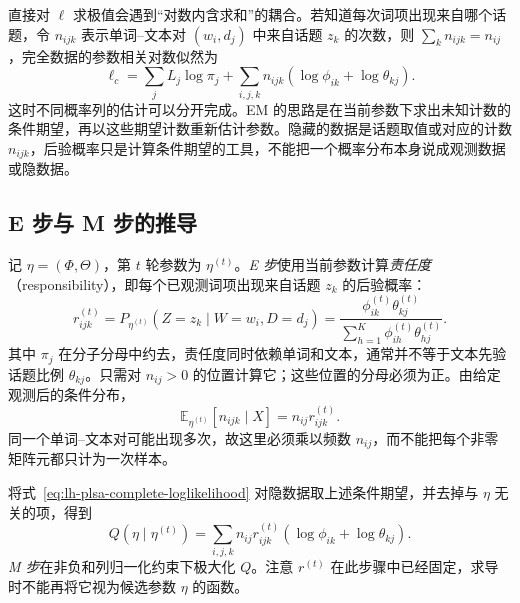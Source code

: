 直接对 $\ell$ 求极值会遇到“对数内含求和”的耦合。若知道每次词项出现来自哪个话题，令 $n_{ijk}$ 表示单词--文本对 $(w_i,d_j)$ 中来自话题 $z_k$ 的次数，则 $\sum_kn_{ijk}=n_{ij}$，完全数据的参数相关对数似然为
\begin{equation}
\ell_c=\sum_jL_j\log\pi_j+
\sum_{i,j,k}n_{ijk}(\log\phi_{ik}+\log\theta_{kj}).
\label{eq:lh-plsa-complete-loglikelihood}
\end{equation}
这时不同概率列的估计可以分开完成。EM 的思路是在当前参数下求出未知计数的条件期望，再以这些期望计数重新估计参数。隐藏的数据是话题取值或对应的计数 $n_{ijk}$，后验概率只是计算条件期望的工具，不能把一个概率分布本身说成观测数据或隐数据。

\subsection{E 步与 M 步的推导}
\label{subsec:lh-plsa-em-derivation}

记 $\eta=(\Phi,\Theta)$，第 $t$ 轮参数为 $\eta^{(t)}$。\emph{E 步}使用当前参数计算\emph{责任度}（responsibility），即每个已观测词项出现来自话题 $z_k$ 的后验概率：
\begin{equation}
r_{ijk}^{(t)}=P_{\eta^{(t)}}(Z=z_k\mid W=w_i,D=d_j)
=\frac{\phi_{ik}^{(t)}\theta_{kj}^{(t)}}
{\sum_{h=1}^K\phi_{ih}^{(t)}\theta_{hj}^{(t)}}.
\label{eq:lh-plsa-e-step}
\end{equation}
其中 $\pi_j$ 在分子分母中约去，责任度同时依赖单词和文本，通常并不等于文本先验话题比例 $\theta_{kj}$。只需对 $n_{ij}>0$ 的位置计算它；这些位置的分母必须为正。由给定观测后的条件分布，
\begin{equation}
\mathbb E_{\eta^{(t)}}[n_{ijk}\mid X]=n_{ij}r_{ijk}^{(t)}.
\label{eq:lh-plsa-expected-count}
\end{equation}
同一个单词--文本对可能出现多次，故这里必须乘以频数 $n_{ij}$，而不能把每个非零矩阵元都只计为一次样本。

将式~\eqref{eq:lh-plsa-complete-loglikelihood} 对隐数据取上述条件期望，并去掉与 $\eta$ 无关的项，得到
\begin{equation}
Q(\eta\mid\eta^{(t)})=
\sum_{i,j,k}n_{ij}r_{ijk}^{(t)}
(\log\phi_{ik}+\log\theta_{kj}).
\label{eq:lh-plsa-q-function}
\end{equation}
\emph{M 步}在非负和列归一化约束下极大化 $Q$。注意 $r^{(t)}$ 在此步骤中已经固定，求导时不能再将它视为候选参数 $\eta$ 的函数。

